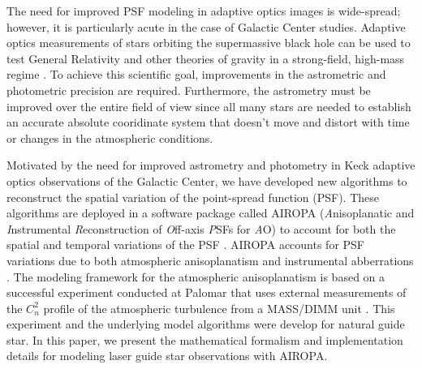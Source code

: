 







The need for improved PSF modeling in adaptive optics images is
wide-spread; however, it is particularly acute in the case of Galactic
Center studies. Adaptive optics measurements of stars orbiting the
supermassive black hole can be used to test General
Relativity and other theories of gravity in a strong-field, high-mass
regime \cite{Hees:2017}. To achieve this scientific goal, improvements in the
astrometric and photometric precision are required. Furthermore, the
astrometry must be improved over the entire field of view since all
many stars are needed to establish an accurate absolute cooridinate
system that doesn't move and distort with time or changes in the
atmospheric conditions.

Motivated by the need for improved astrometry and photometry in
Keck adaptive optics observations of the Galactic Center, we have developed new
algorithms to reconstruct the spatial variation of the point-spread
function (PSF). 
These algorithms are deployed in a software package called
 AIROPA ({\it A}nisoplanatic and {\it I}nstrumental {\it
  R}econstruction of {\it O}ff-axis {\it P}SFs for {\it A}O) to
account for both the spatial and temporal variations of the PSF
\cite{Fitzgerald:2012,Sitarski:2014,Witzel:2016}. 
AIROPA accounts for PSF variations due to both atmospheric
anisoplanatism \cite{Fitzgerald:2012} and instrumental abberrations
\cite{Sitarski:2014}. The modeling framework for the
atmospheric anisoplanatism is based on a successful experiment
conducted at Palomar that uses external measurements of the $C_n^2$
profile of the atmospheric turbulence from a MASS/DIMM unit
\cite{Britton:2006}.  This experiment and the underlying model
algorithms were develop for natural guide star. In this paper, 
we present the mathematical formalism and implementation details for
modeling laser guide star observations with AIROPA. 

